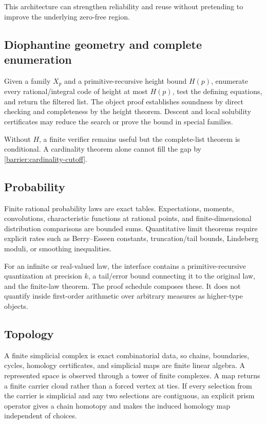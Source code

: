 This architecture can strengthen reliability and reuse without pretending to improve
the underlying zero-free region.

\subsection{Diophantine geometry and complete enumeration}

Given a family \(X_p\) and a primitive-recursive height bound \(H(p)\), enumerate every
rational/integral code of height at most \(H(p)\), test the defining equations, and
return the filtered list.  The object proof establishes soundness by direct checking
and completeness by the height theorem.  Descent and local solubility certificates may
reduce the search or prove the bound in special families.

Without \(H\), a finite verifier remains useful but the complete-list theorem is
conditional.  A cardinality theorem alone cannot fill the gap by
\cref{barrier:cardinality-cutoff}.

\subsection{Probability}

Finite rational probability laws are exact tables.  Expectations, moments,
convolutions, characteristic functions at rational points, and finite-dimensional
distribution comparisons are bounded sums.  Quantitative limit theorems require
explicit rates such as Berry--Esseen constants, truncation/tail bounds, Lindeberg
moduli, or smoothing inequalities.

For an infinite or real-valued law, the interface contains a primitive-recursive
quantization at precision \(k\), a tail/error bound connecting it to the original law,
and the finite-law theorem.  The proof schedule composes these.  It does not quantify
inside first-order arithmetic over arbitrary measures as higher-type objects.

\subsection{Topology}

A finite simplicial complex is exact combinatorial data, so chains, boundaries, cycles,
homology certificates, and simplicial maps are finite linear algebra.  A represented
space is observed through a tower of finite complexes.  A map returns a finite carrier
cloud rather than a forced vertex at ties.  If every selection from the carrier is
simplicial and any two selections are contiguous, an explicit prism operator gives a
chain homotopy and makes the induced homology map independent of choices.

